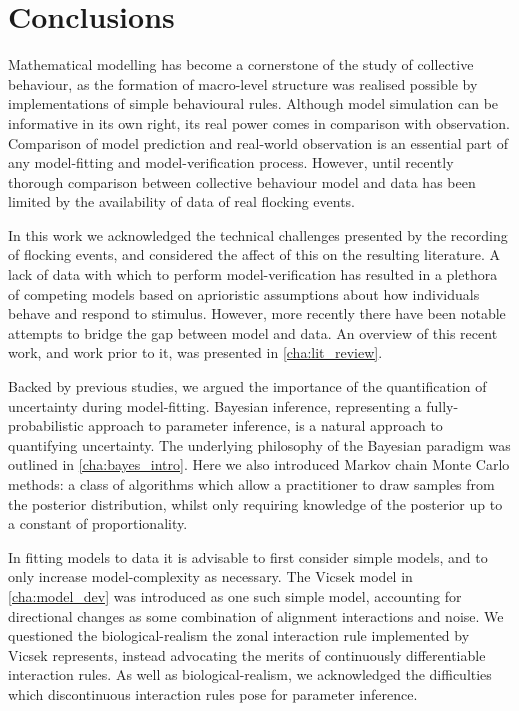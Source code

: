 \chapter*{Conclusions}
\label{cha:conc}


Mathematical modelling has become a cornerstone of the study of collective
behaviour, as the formation of macro-level structure was realised possible by
implementations of simple behavioural rules. Although model simulation can be
informative in its own right, its real power comes in comparison with
observation. Comparison of model prediction and real-world observation is an
essential part of any model-fitting and model-verification process. However,
until recently thorough comparison between collective behaviour model and data
has been limited by the availability of data of real flocking events.

In this work we acknowledged the technical challenges presented by the
recording of flocking events, and considered the affect of this on the
resulting literature. A lack of data with which to perform model-verification
has resulted in a plethora of competing models based on aprioristic assumptions
about how individuals behave and respond to stimulus. However, more recently
there have been notable attempts to bridge the gap between model and data. An
overview of this recent work, and work prior to it, was presented in
\cref{cha:lit_review}.

Backed by previous studies, we argued the importance of the quantification of
uncertainty during model-fitting. Bayesian inference, representing a
fully-probabilistic approach to parameter inference, is a natural approach to
quantifying uncertainty. The underlying philosophy of the Bayesian paradigm was
outlined in \cref{cha:bayes_intro}. Here we also introduced Markov chain Monte
Carlo methods: a class of algorithms which allow a practitioner to draw samples
from the posterior distribution, whilst only requiring knowledge of the
posterior up to a constant of proportionality.

In fitting models to data it is advisable to first consider simple models, and
to only increase model-complexity as necessary. The Vicsek model in
\cref{cha:model_dev} was introduced as one such simple model, accounting for
directional changes as some combination of alignment interactions and noise. We
questioned the biological-realism the zonal interaction rule implemented by
Vicsek represents, instead advocating the merits of continuously differentiable
interaction rules. As well as biological-realism, we acknowledged the
difficulties which discontinuous interaction rules pose for parameter
inference.

